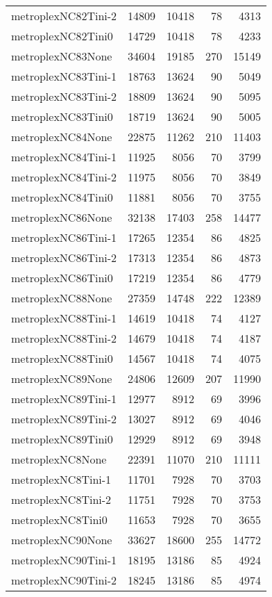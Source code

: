 \begin{longtable}{lrrrr}
metroplexNC82Tini-2 & 14809 & 10418 & 78 & 4313 \\
metroplexNC82Tini0 & 14729 & 10418 & 78 & 4233 \\
metroplexNC83None & 34604 & 19185 & 270 & 15149 \\
metroplexNC83Tini-1 & 18763 & 13624 & 90 & 5049 \\
metroplexNC83Tini-2 & 18809 & 13624 & 90 & 5095 \\
metroplexNC83Tini0 & 18719 & 13624 & 90 & 5005 \\
metroplexNC84None & 22875 & 11262 & 210 & 11403 \\
metroplexNC84Tini-1 & 11925 & 8056 & 70 & 3799 \\
metroplexNC84Tini-2 & 11975 & 8056 & 70 & 3849 \\
metroplexNC84Tini0 & 11881 & 8056 & 70 & 3755 \\
metroplexNC86None & 32138 & 17403 & 258 & 14477 \\
metroplexNC86Tini-1 & 17265 & 12354 & 86 & 4825 \\
metroplexNC86Tini-2 & 17313 & 12354 & 86 & 4873 \\
metroplexNC86Tini0 & 17219 & 12354 & 86 & 4779 \\
metroplexNC88None & 27359 & 14748 & 222 & 12389 \\
metroplexNC88Tini-1 & 14619 & 10418 & 74 & 4127 \\
metroplexNC88Tini-2 & 14679 & 10418 & 74 & 4187 \\
metroplexNC88Tini0 & 14567 & 10418 & 74 & 4075 \\
metroplexNC89None & 24806 & 12609 & 207 & 11990 \\
metroplexNC89Tini-1 & 12977 & 8912 & 69 & 3996 \\
metroplexNC89Tini-2 & 13027 & 8912 & 69 & 4046 \\
metroplexNC89Tini0 & 12929 & 8912 & 69 & 3948 \\
metroplexNC8None & 22391 & 11070 & 210 & 11111 \\
metroplexNC8Tini-1 & 11701 & 7928 & 70 & 3703 \\
metroplexNC8Tini-2 & 11751 & 7928 & 70 & 3753 \\
metroplexNC8Tini0 & 11653 & 7928 & 70 & 3655 \\
metroplexNC90None & 33627 & 18600 & 255 & 14772 \\
metroplexNC90Tini-1 & 18195 & 13186 & 85 & 4924 \\
metroplexNC90Tini-2 & 18245 & 13186 & 85 & 4974 \\

\end{longtable}
